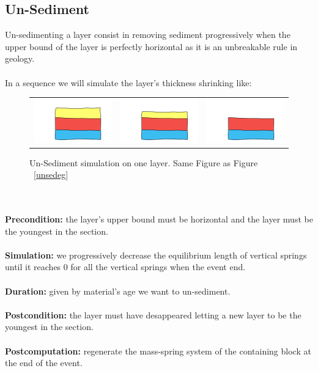\documentclass[12pt, a4paper]{report} %
\begin{document}
\subsection{Un-Sediment}
\label{sub:unsed}
Un-sedimenting a layer consist in removing sediment progressively when the upper bound of the layer is perfectly horizontal as it is an unbreakable rule in geology.\\\\

In a sequence we will simulate the layer's thickness shrinking like:
\begin{figure}[H]
\centering
\begin{tabular}{@{}ccc@{}}
\includegraphics[width=.35\textwidth]{unSedimentDescription0.png}&
\includegraphics[width=.35\textwidth]{unSedimentDescription1.png}&
\includegraphics[width=.35\textwidth]{unSedimentDescription2.png}\\
\end{tabular}
\caption{Un-Sediment simulation on one layer. Same Figure as Figure ~\ref{unsedeg}}
\label{unsedeg2}
\end{figure}\\\\
\textbf{Precondition:} the layer's upper bound must be horizontal and the layer must be the youngest in the section.\\\\
\textbf{Simulation:} we progressively decrease the equilibrium length of vertical springs until it reaches $0$ for all the vertical springs when the event end.\\\\
\textbf{Duration:} given by material's age we want to un-sediment.\\\\
\textbf{Postcondition:} the layer must have desappeared letting a new layer to be the youngest 
in the section.\\\\
\textbf{Postcomputation:} regenerate the mass-spring system of the containing block at the end of the event.\\\\
\end{document}

